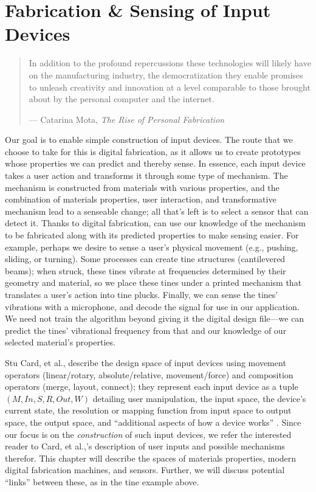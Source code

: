 \chapter{Fabrication \& Sensing of Input Devices}


\begin{quote}
In addition to the profound repercussions these technologies
will likely have on the manufacturing industry, the
democratization they enable promises to unleash creativity
and innovation at a level comparable to those brought about
by the personal computer and the internet.

--- Catarina Mota, \emph{The Rise of Personal Fabrication}
\end{quote}

Our goal is to enable simple construction of input devices. The route that we choose to take for this is digital fabrication, as it allows us to create prototypes whose properties we can predict and thereby sense. In essence, each input device takes a user action and transforms it through some type of mechanism. The mechanism is constructed from materials with various properties, and the combination of materials properties, user interaction, and transformative mechanism lead to a senseable change; all that's left is to select a sensor that can detect it. Thanks to digital fabrication, can use our knowledge of the mechanism to be fabricated along with its predicted properties to make sensing easier.  For example, perhaps we desire to sense a user's physical movement (e.g., pushing, sliding, or turning). Some processes can create tine structures (cantilevered beams); when struck, these tines vibrate at frequencies determined by their geometry and material, so we place these tines under a printed mechanism that translates a user's action into tine plucks. Finally, we can sense the tines' vibrations with a microphone, and decode the signal for use in our application. We need not train the algorithm beyond giving it the digital design file---we can predict the tines' vibrational frequency from that and our knowledge of our selected material's properties.

Stu Card, et al., describe the design space of input devices using movement operators (linear/rotary, absolute/relative, movement/force) and composition operators (merge, layout, connect); they represent each input device as a tuple $(M, In, S, R, Out, W)$ detailing user manipulation, the input space, the device's current state, the resolution or mapping function from input space to output space, the output space, and ``additional aspects of how a device works'' \cite{card-input}. Since our focus is on the \emph{construction} of such input devices, we refer the interested reader to Card, et al.,'s description of user inputs and possible mechanisms therefor. This chapter will describe the spaces of materials properties, modern digital fabrication machines, and sensors. Further, we will discuss potential ``links'' between these, as in the tine example above.

